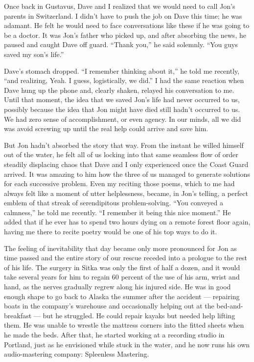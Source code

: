 Once back in Gustavus, Dave and I realized that we would need to call
Jon's parents in Switzerland. I didn't have to push the job on Dave this
time; he was adamant. He felt he would need to face conversations like
these if he was going to be a doctor. It was Jon's father who picked up,
and after absorbing the news, he paused and caught Dave off guard.
``Thank you,'' he said solemnly. ``You guys saved my son's life.''

Dave's stomach dropped. ``I remember thinking about it,'' he told me
recently, ``and realizing, Yeah. I guess, logistically, we did.'' I had
the same reaction when Dave hung up the phone and, clearly shaken,
relayed his conversation to me. Until that moment, the idea that we
saved Jon's life had never occurred to us, possibly because the idea
that Jon might have died still hadn't occurred to us. We had zero sense
of accomplishment, or even agency. In our minds, all we did was avoid
screwing up until the real help could arrive and save him.

But Jon hadn't absorbed the story that way. From the instant he willed
himself out of the water, he felt all of us locking into that same
seamless flow of order steadily displacing chaos that Dave and I only
experienced once the Coast Guard arrived. It was amazing to him how the
three of us managed to generate solutions for each successive problem.
Even my reciting those poems, which to me had always felt like a moment
of utter helplessness, became, in Jon's telling, a perfect emblem of
that streak of serendipitous problem-solving. ``You conveyed a
calmness,'' he told me recently. ``I remember it being this nice
moment.'' He added that if he ever has to spend two hours dying on a
remote forest floor again, having me there to recite poetry would be one
of his top ways to do it.

The feeling of inevitability that day became only more pronounced for
Jon as time passed and the entire story of our rescue receded into a
prologue to the rest of his life. The surgery in Sitka was only the
first of half a dozen, and it would take several years for him to regain
60 percent of the use of his arm, wrist and hand, as the nerves
gradually regrew along his injured side. He was in good enough shape to
go back to Alaska the summer after the accident --- repairing boats in
the company's warehouse and occasionally helping out at the
bed-and-breakfast --- but he struggled. He could repair kayaks but
needed help lifting them. He was unable to wrestle the mattress corners
into the fitted sheets when he made the beds. After that, he started
working at a recording studio in Portland, just as he envisioned while
stuck in the water, and he now runs his own audio-mastering company:
Spleenless Mastering.

